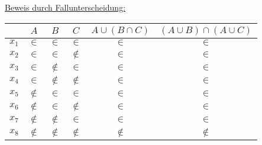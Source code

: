 \documentclass{scrreprt}
\begin{document}
\begin{enumerate}[(1)]
  \newpage
  \underline{Beweis durch Fallunterscheidung:}
  \begin{center}
    \begin{tabular}{c | c | c | c | c | c}
      & $A$ & $B$ & $C$ & $A \cup (B \cap C)$ & $(A \cup B) \cap (A \cup C)$  \\
      \hline
      $x_1$ & $\in$ & $\in$ & $\in$ & $\in$ & $\in$ \\
      $x_2$ & $\in$ & $\in$ & $\notin$ & $\in$ & $\in$ \\
      $x_3$ & $\in$ & $\notin$ & $\in$ & $\in$ & $\in$ \\
      $x_4$ & $\in$ & $\notin$ & $\notin$ & $\in$ & $\in$ \\
      $x_5$ & $\notin$ & $\in$ & $\in$ & $\in$ & $\in$ \\
      $x_6$ & $\notin$ & $\in$ & $\notin$ & $\in$ & $\in$ \\
      $x_7$ & $\notin$ & $\notin$ & $\in$ & $\in$ & $\in$ \\
      $x_8$ & $\notin$ & $\notin$ & $\notin$ & $\notin$ & $\notin$ \\
    \end{tabular}
  \end{center}
\end{enumerate}
\end{document}
